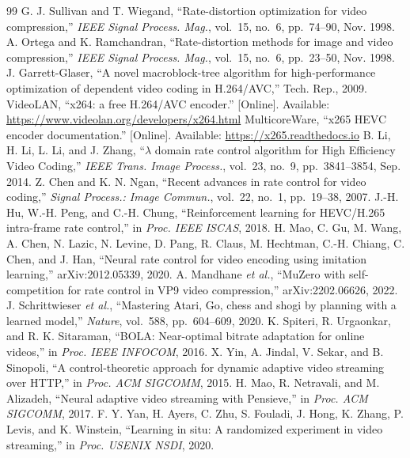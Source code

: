 \documentclass[conference]{IEEEtran}
\begin{document}
\begin{thebibliography}{99}\footnotesize
{} G. J. Sullivan and T. Wiegand, ``Rate-distortion optimization for video compression,'' \emph{IEEE Signal Process. Mag.}, vol.~15, no.~6, pp.~74--90, Nov. 1998.
 A. Ortega and K. Ramchandran, ``Rate-distortion methods for image and video compression,'' \emph{IEEE Signal Process. Mag.}, vol.~15, no.~6, pp.~23--50, Nov. 1998.
 J. Garrett-Glaser, ``A novel macroblock-tree algorithm for high-performance optimization of dependent video coding in H.264/AVC,'' Tech. Rep., 2009.
 VideoLAN, ``x264: a free H.264/AVC encoder.'' [Online]. Available: \url{https://www.videolan.org/developers/x264.html}
 MulticoreWare, ``x265 HEVC encoder documentation.'' [Online]. Available: \url{https://x265.readthedocs.io}
 B. Li, H. Li, L. Li, and J. Zhang, ``$\lambda$ domain rate control algorithm for High Efficiency Video Coding,'' \emph{IEEE Trans. Image Process.}, vol.~23, no.~9, pp.~3841--3854, Sep. 2014.
 Z. Chen and K. N. Ngan, ``Recent advances in rate control for video coding,'' \emph{Signal Process.: Image Commun.}, vol.~22, no.~1, pp.~19--38, 2007.
 J.-H. Hu, W.-H. Peng, and C.-H. Chung, ``Reinforcement learning for HEVC/H.265 intra-frame rate control,'' in \emph{Proc. IEEE ISCAS}, 2018.
 H. Mao, C. Gu, M. Wang, A. Chen, N. Lazic, N. Levine, D. Pang, R. Claus, M. Hechtman, C.-H. Chiang, C. Chen, and J. Han, ``Neural rate control for video encoding using imitation learning,'' arXiv:2012.05339, 2020.
 A. Mandhane \emph{et al.}, ``MuZero with self-competition for rate control in VP9 video compression,'' arXiv:2202.06626, 2022.
 J. Schrittwieser \emph{et al.}, ``Mastering Atari, Go, chess and shogi by planning with a learned model,'' \emph{Nature}, vol.~588, pp.~604--609, 2020.
 K. Spiteri, R. Urgaonkar, and R. K. Sitaraman, ``BOLA: Near-optimal bitrate adaptation for online videos,'' in \emph{Proc. IEEE INFOCOM}, 2016.
 X. Yin, A. Jindal, V. Sekar, and B. Sinopoli, ``A control-theoretic approach for dynamic adaptive video streaming over HTTP,'' in \emph{Proc. ACM SIGCOMM}, 2015.
 H. Mao, R. Netravali, and M. Alizadeh, ``Neural adaptive video streaming with Pensieve,'' in \emph{Proc. ACM SIGCOMM}, 2017.
 F. Y. Yan, H. Ayers, C. Zhu, S. Fouladi, J. Hong, K. Zhang, P. Levis, and K. Winstein, ``Learning in situ: A randomized experiment in video streaming,'' in \emph{Proc. USENIX NSDI}, 2020.

\end{thebibliography}
\end{document}
